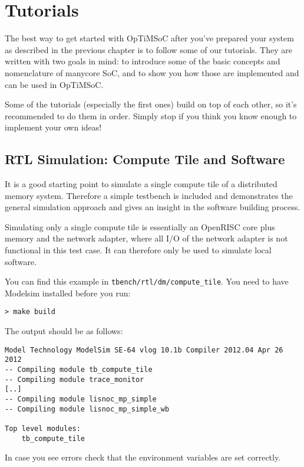 \chapter{Tutorials}
\label{chap:tutorials}

The best way to get started with OpTiMSoC after you've prepared your
system as described in the previous chapter is to follow some of our
tutorials. They are written with two goals in mind: to introduce some
of the basic concepts and nomenclature of manycore SoC, and to show
you how those are implemented and can be used in OpTiMSoC.

Some of the tutorials (especially the first ones) build on top of each
other, so it's recommended to do them in order. Simply stop if you
think you know enough to implement your own ideas!

\section{RTL Simulation: Compute Tile and Software}

It is a good starting point to simulate a single compute tile of a
distributed memory system. Therefore a simple testbench is included
and demonstrates the general simulation approach and gives an insight
in the software building process.

Simulating only a single compute tile is essentially an OpenRISC core
plus memory and the network adapter, where all I/O of the network
adapter is not functional in this test case. It can therefore only be
used to simulate local software.

You can find this example in \verb|tbench/rtl/dm/compute_tile|. You
need to have Modelsim installed before you run:

\begin{verbatim}
> make build
\end{verbatim}

The output should be as follows:

\begin{verbatim}
Model Technology ModelSim SE-64 vlog 10.1b Compiler 2012.04 Apr 26 2012
-- Compiling module tb_compute_tile
-- Compiling module trace_monitor
[..]
-- Compiling module lisnoc_mp_simple
-- Compiling module lisnoc_mp_simple_wb

Top level modules:
	tb_compute_tile
\end{verbatim}

In case you see errors check that the environment variables are set
correctly.


